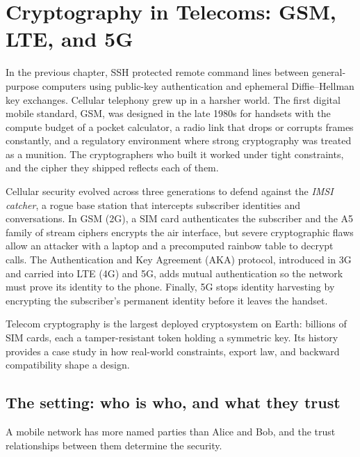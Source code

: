 \chapter{Cryptography in Telecoms: GSM, LTE, and 5G}

In the previous chapter, SSH protected remote command lines between general-purpose computers using public-key authentication and ephemeral Diffie--Hellman key exchanges. Cellular telephony grew up in a harsher world. The first digital mobile standard, GSM, was designed in the late 1980s for handsets with the compute budget of a pocket calculator, a radio link that drops or corrupts frames constantly, and a regulatory environment where strong cryptography was treated as a munition. The cryptographers who built it worked under tight constraints, and the cipher they shipped reflects each of them.

Cellular security evolved across three generations to defend against the \emph{IMSI catcher}, a rogue base station that intercepts subscriber identities and conversations. In GSM (2G), a SIM card authenticates the subscriber and the A5 family of stream ciphers encrypts the air interface, but severe cryptographic flaws allow an attacker with a laptop and a precomputed rainbow table to decrypt calls. The Authentication and Key Agreement (AKA) protocol, introduced in 3G and carried into LTE (4G) and 5G, adds mutual authentication so the network must prove its identity to the phone. Finally, 5G stops identity harvesting by encrypting the subscriber's permanent identity before it leaves the handset.

Telecom cryptography is the largest deployed cryptosystem on Earth: billions of SIM cards, each a tamper-resistant token holding a symmetric key. Its history provides a case study in how real-world constraints, export law, and backward compatibility shape a design.

\section{The setting: who is who, and what they trust}
\label{ch29:setting}

A mobile network has more named parties than Alice and Bob, and the trust relationships between them determine the security.


